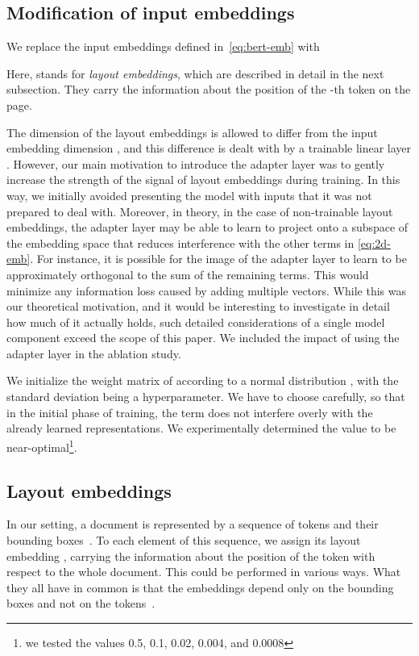 \subsection{Modification of input embeddings}
\label{sec:method}


We replace the input embeddings defined in~\eqref{eq:bert-emb} with

Here,  stands for \emph{layout embeddings}, which are
described in detail in the next subsection. They carry the information about
the position of the -th token on the page.

The dimension  of the layout embeddings is allowed to differ from the input
embedding dimension , and this difference is dealt with by a trainable
linear layer . However, our main motivation to
introduce the adapter layer  was to gently increase the strength of the
signal of layout embeddings during training. In this way, we initially avoided
presenting the model with inputs that it was not prepared to deal with. Moreover, in
theory, in the case of non-trainable layout embeddings, the adapter layer may be
able to learn to project  onto a subspace of the embedding space
that reduces interference with the other terms in \eqref{eq:2d-emb}. For
instance, it is possible for the image of the adapter layer to learn to be
approximately orthogonal to the sum of the remaining terms. This would minimize
any information loss caused by adding multiple vectors. While this was our
theoretical motivation, and it would be interesting to investigate in detail how
much of it actually holds, such detailed considerations of a single model
component exceed the scope of this paper. We included the impact of using the
adapter layer in the ablation study.

We initialize the weight matrix of  according to a normal distribution
, with the standard deviation  being a
hyperparameter. We have to choose  carefully, so that in the initial
phase of training, the  term does not interfere overly with the
already learned representations. We experimentally determined the value
 to be near-optimal\footnote{we tested the values 0.5, 0.1, 0.02,
  0.004, and 0.0008}.


\subsection{Layout embeddings}
\label{sec:context-embeddings}

In our setting, a document is represented by a sequence of tokens  and
their bounding boxes~. To each element of this sequence, we assign its
layout embedding , carrying the information about the position of the
token with respect to the whole document. This could be performed in various
ways. What they all have in common is that the embeddings  depend only
on the bounding boxes  and not on the tokens~.

